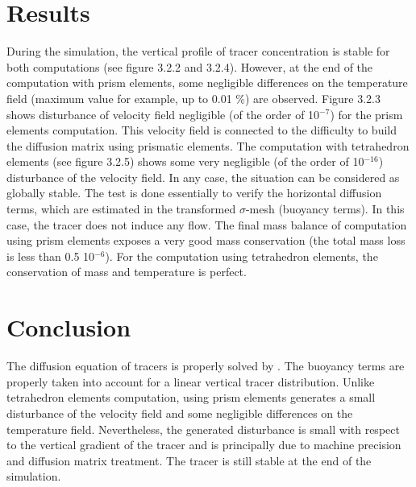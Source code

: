 \section{Results}
%
During the simulation, the vertical profile of tracer concentration is
stable for both computations (see figure 3.2.2 and 3.2.4).
However, at the end of the computation with prism elements,
some negligible differences on the temperature field (maximum value
for example, up to 0.01 \%) are observed.
Figure 3.2.3 shows disturbance of velocity field negligible
(of the order of 10$^{-7}$) for the prism elements computation.
This velocity field is connected to the difficulty to build the
diffusion matrix using prismatic elements.
The computation with tetrahedron elements (see figure 3.2.5)
shows some very negligible (of the order of 10$^{-16}$) disturbance
of the velocity field.
In any case, the situation can be considered as globally stable.
The test is done essentially to verify the horizontal diffusion terms,
which are estimated in the transformed $\sigma$-mesh (buoyancy terms).
In this case, the tracer does not induce any flow.
The final mass balance of computation using prism elements exposes a
very good mass conservation (the total mass loss is less than
0.5 10$^{-6}$).
For the computation using tetrahedron elements, the conservation of
mass and temperature is perfect.
%
\section{Conclusion}
%
The diffusion equation of tracers is properly solved by .
The buoyancy terms are properly taken into account for a linear vertical
 tracer distribution.
Unlike tetrahedron elements computation, using prism elements generates
a small disturbance of the velocity field and some negligible
differences on the temperature field.
Nevertheless, the generated disturbance is small with respect to the
vertical gradient of the tracer and is principally due to machine
precision and diffusion matrix treatment.
The tracer is still stable at the end of the simulation.
%
%

